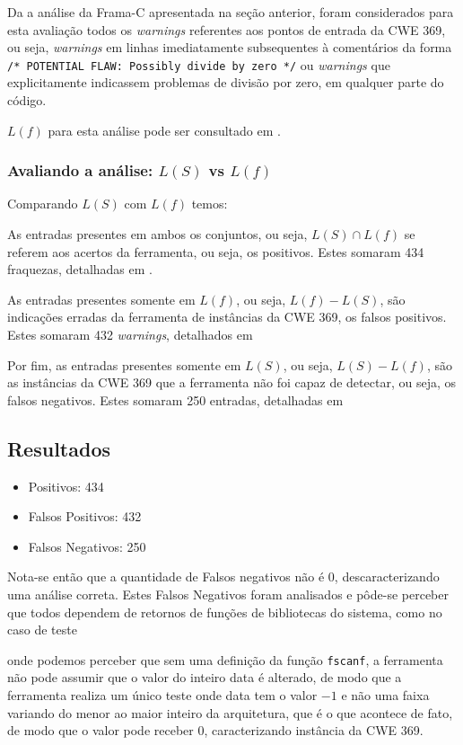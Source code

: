   Da a análise da Frama-C apresentada na seção anterior, foram considerados para esta avaliação todos os \textit{warnings} referentes aos pontos de entrada da CWE 369, ou seja, \textit{warnings} em linhas imediatamente subsequentes à comentários da forma
  \lstinline{/* POTENTIAL FLAW: Possibly divide by zero */}
  ou \textit{warnings} que explicitamente indicassem problemas de divisão por zero, em qualquer parte do código.

  $L(f)$ para esta análise pode ser consultado em .

  \subsubsection{Avaliando a análise: $L(S)$ vs $L(f)$}

  Comparando $L(S)$ com $L(f)$ temos:

  As entradas presentes em ambos os conjuntos, ou seja, $L(S) \cap L(f)$ se referem aos acertos da ferramenta, ou seja, os positivos. Estes somaram 434 fraquezas, detalhadas em .

  As entradas presentes somente em $L(f)$, ou seja, $L(f) - L(S)$, são indicações erradas da ferramenta de instâncias da CWE 369, os falsos positivos. Estes somaram 432 \textit{warnings}, detalhados em 

  Por fim, as entradas presentes somente em $L(S)$, ou seja, $L(S) - L(f)$, são as instâncias da CWE 369 que a ferramenta não foi capaz de detectar, ou seja, os falsos negativos. Estes somaram 250 entradas, detalhadas em 

  \subsection{Resultados}
  \begin{itemize}
    \item Positivos: 434
    \item Falsos Positivos: 432
    \item Falsos Negativos: 250
  \end{itemize}

      Nota-se então que a quantidade de Falsos negativos não é 0, descaracterizando uma análise correta. Estes Falsos Negativos foram analisados e pôde-se perceber que todos dependem de retornos de funções de bibliotecas do sistema, como no caso de teste 
      
      onde podemos perceber que sem uma definição da função \lstinline{fscanf}, a ferramenta não pode assumir que o valor do inteiro data é alterado, de modo que a ferramenta realiza um único teste onde data tem o valor $-1$ e não uma faixa variando do menor ao maior inteiro da arquitetura, que é o que acontece de fato, de modo que o valor pode receber 0, caracterizando instância da CWE 369. 

